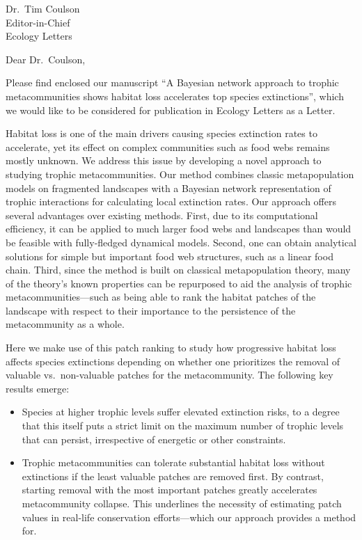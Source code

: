 \documentclass[11pt]{letter}
\date{January 17, 2020}
\begin{document}
\begin{letter}{
    \vspace{-2cm}
    
    Dr.~Tim Coulson\\
    Editor-in-Chief\\
    Ecology Letters}


\opening{Dear Dr.~Coulson,}

Please find enclosed our manuscript ``A  Bayesian network approach to trophic metacommunities shows habitat loss accelerates top species extinctions'', which we would like to be considered for publication in Ecology Letters as a Letter.

Habitat loss is one of the main drivers causing species extinction rates to accelerate, yet its effect on complex communities such as food webs remains mostly unknown. We address this issue by developing a novel approach to studying trophic metacommunities. Our method combines classic metapopulation models on fragmented landscapes with a Bayesian network representation of trophic interactions for calculating local extinction rates. Our approach offers several advantages over existing methods. First, due to its computational efficiency, it can be applied to much larger food webs and landscapes than would be feasible with fully-fledged dynamical models. Second, one can obtain analytical solutions for simple but important food web structures, such as a linear food chain. Third, since the method is built on classical metapopulation theory, many of the theory's known properties can be repurposed to aid the analysis of trophic metacommunities---such as being able to rank the habitat patches of the landscape with respect to their importance to the persistence of the metacommunity as a whole.

Here we make use of this patch ranking to study how progressive habitat loss affects species extinctions depending on whether one prioritizes the removal of valuable vs.\ non-valuable patches for the metacommunity. The following key results emerge:

\begin{itemize}

\item Species at higher trophic levels suffer elevated extinction risks, to a degree that this itself puts a strict limit on the maximum number of trophic levels that can persist, irrespective of energetic or other constraints.

\item Trophic metacommunities can tolerate substantial habitat loss without extinctions if the least valuable patches are removed first. By contrast, starting removal with the most important patches greatly accelerates metacommunity collapse. This underlines the necessity of estimating patch values in real-life conservation efforts---which our approach provides a method for.


\end{itemize}
\end{letter}
\end{document}
